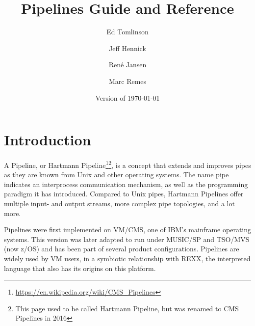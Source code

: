 

\renewcommand{\isbn}{978-90-819090-3-7}    
\setcounter{tocdepth}{1} 
\title{Pipelines Guide and Reference}
\author{Ed Tomlinson \and Jeff Hennick \and René Jansen \and Marc Remes}
\date{\null\hfill Version  of \today}
\maketitle
{}
\pagestyle{plain}
\frontmatter
{}

\pagestyle{plain}


\tableofcontents
\pagestyle{fancy}
\newpage
{}
\frontmatter
\large


\mainmatter%
\lstset{showstringspaces=false}
\lstset{keepspaces=true}




\chapter{Introduction}
A Pipeline, or Hartmann
Pipeline\footnote{\url{https://en.wikipedia.org/wiki/CMS_Pipelines}}\footnote{This
  page used to be called Hartmann Pipeline, but was renamed to CMS Pipelines
  in 2016}, is a concept that extends and improves pipes as they are known from Unix and other operating systems.
The name pipe indicates an interprocess communication mechanism, as well as the programming paradigm it has introduced. Compared to Unix pipes, Hartmann Pipelines offer multiple input- and output streams, more complex pipe topologies, and a lot more.

Pipelines were first implemented on VM/CMS, one of IBM's mainframe
operating systems. This version was later adapted to run under
MUSIC/SP and TSO/MVS (now z/OS) and has been part of several product configurations. Pipelines are
widely used by VM users, in a symbiotic relationship with REXX, the
interpreted language that also has its origins on this platform.

